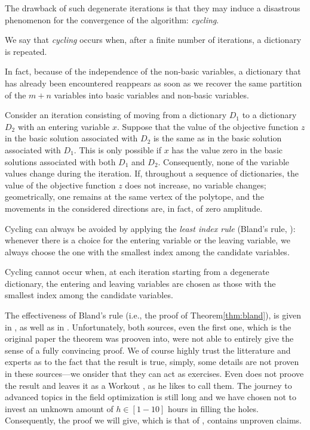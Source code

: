 The drawback of such degenerate iterations is that they may induce a disastrous phenomenon for the convergence of the algorithm: \emph{cycling}.

\begin{definition}
    We say that \emph{cycling} occurs when, after a finite number of iterations, a dictionary is repeated.
\end{definition}

\begin{remark}
    In fact, because of the independence of the non-basic variables, a dictionary that has already been encountered reappears as soon as we recover the same partition of the $m+n$ variables into basic variables and non-basic variables.
\end{remark}

\begin{remark} 
    Consider an iteration consisting of moving from a dictionary $D_1$ to a dictionary $D_2$ with an entering variable $x$. Suppose that the value of the objective function $z$ in the basic solution associated with $D_2$ is the same as in the basic solution associated with $D_1$. This is only possible if $x$ has the value zero in the basic solutions associated with both $D_1$ and $D_2$. Consequently, none of the variable values change during the iteration. If, throughout a sequence of dictionaries, the value of the objective function $z$ does not increase, no variable changes; geometrically, one remains at the same vertex of the polytope, and the movements in the considered directions are, in fact, of zero amplitude.
\end{remark}

Cycling can always be avoided by applying the \emph{least index rule} (Bland's rule, \cite{bland1977}): whenever there is a choice for the entering variable or the leaving variable, we always choose the one with the smallest index among the candidate variables. 

\begin{theorem}\label{thm:bland}
    Cycling cannot occur when, at each iteration starting from a degenerate dictionary, the entering and leaving variables are chosen as those with the smallest index among the candidate variables.
\end{theorem}

The effectiveness of Bland's rule (i.e., the proof of Theorem\ref{thm:bland}), is given in \cite{bland1977}, as well as in \cite{charonhudry2019}. Unfortunately, both sources, even the first one, which is the original paper the theorem was prooven into, were not able to entirely give the sense of a fully convincing proof. We of course highly trust the litterature and experts as to the fact that the result is true, simply, some details are not proven in these sources---we onsider that they can act as exercises. Even \cite{hurlbert2009} does not proove the result and leaves it as a \og Workout \fg, as he likes to call them. The journey to advanced topics in the field optimization is still long and we have chosen not to invest an unknown amount of $ h \in [1-10] $ hours in filling the holes. Consequently, the proof we will give, which is that of \cite{charonhudry2019}, contains unproven claims.

